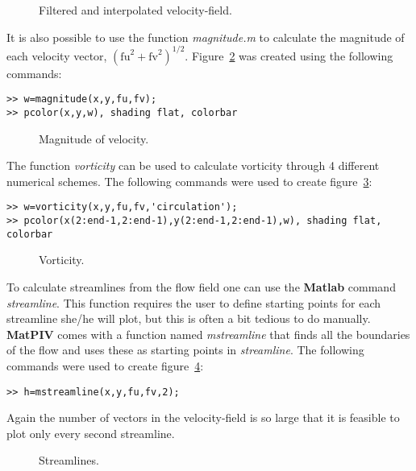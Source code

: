 \documentclass{book}
\begin{document}
\begin{figure}
\begin{center} 
{}
\end{center}
\caption{Filtered and interpolated velocity-field.}\label{fig:velo}
\end{figure}

It is also possible to use the function {\em magnitude.m} to calculate
the magnitude of each velocity vector,
$(\mbox{fu}^2+\mbox{fv}^2)^{1/2}$. Figure~\ref{fig:magn} was created
using the following commands:
\begin{verbatim}
>> w=magnitude(x,y,fu,fv);
>> pcolor(x,y,w), shading flat, colorbar
\end{verbatim}

\begin{figure}
\begin{center} 
{}
\end{center}
\caption{Magnitude of velocity.}\label{fig:magn}
\end{figure}

The function {\em vorticity} can be used to calculate vorticity
through 4 different numerical schemes. The following commands were
used to create figure~\ref{fig:vort}:

\begin{verbatim}
>> w=vorticity(x,y,fu,fv,'circulation');
>> pcolor(x(2:end-1,2:end-1),y(2:end-1,2:end-1),w), shading flat, colorbar
\end{verbatim}

\begin{figure}
\begin{center} 
{}
\end{center}
\caption{Vorticity.}\label{fig:vort}
\end{figure}

To calculate streamlines from the flow field one can use the {\bf
Matlab} command {\em streamline}. This function requires the user to
define starting points for each streamline she/he will plot, but this
is often a bit tedious to do manually. {\bf MatPIV} comes with a
function named {\em mstreamline} that finds all the boundaries of the
flow and uses these as starting points in {\em streamline}. The
following commands were used to create figure~\ref{fig:streaml}:
\begin{verbatim}
>> h=mstreamline(x,y,fu,fv,2);
\end{verbatim}
Again the number of vectors in the velocity-field is so large that it
is feasible to plot only every second streamline.
\begin{figure}
\begin{center} 
{}
\end{center}
\caption{Streamlines.}\label{fig:streaml}
\end{figure}
\end{document}
